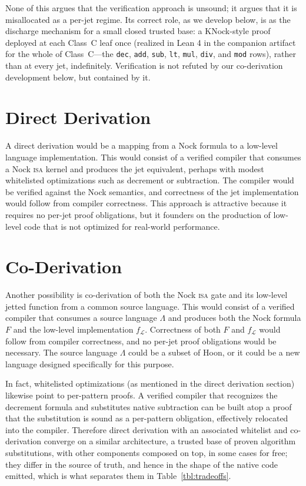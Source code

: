 \documentclass[twoside]{article}
\begin{document}
None of this argues that the verification approach is unsound; it argues that it is misallocated as a per-jet regime.  Its correct role, as we develop below, is as the discharge mechanism for a small closed trusted base: a KNock-style proof deployed at each Class~C leaf once (realized in Lean 4 in the companion artifact for the whole of Class~C---the \lstinline[style=inlinecode]{dec}, \lstinline[style=inlinecode]{add}, \lstinline[style=inlinecode]{sub}, \lstinline[style=inlinecode]{lt}, \lstinline[style=inlinecode]{mul}, \lstinline[style=inlinecode]{div}, and \lstinline[style=inlinecode]{mod} rows), rather than at every jet, indefinitely.  Verification is not refuted by our co-derivation development below, but contained by it.

\section{Direct Derivation}

A direct derivation would be a mapping from a Nock formula to a low-level language implementation.  This would consist of a verified compiler that consumes a Nock \textsc{isa} kernel and produces the jet equivalent, perhaps with modest whitelisted optimizations such as decrement or subtraction.  The compiler would be verified against the Nock semantics, and correctness of the jet implementation would follow from compiler correctness.  This approach is attractive because it requires no per-jet proof obligations, but it founders on the production of low-level code that is not optimized for real-world performance.

\section{Co-Derivation}

Another possibility is co-derivation of both the Nock \textsc{isa} gate and its low-level jetted function from a common source language.  This would consist of a verified compiler that consumes a source language $\Lambda$ and produces both the Nock formula $F$ and the low-level implementation $f_\mathcal{L}$.  Correctness of both $F$ and $f_\mathcal{L}$ would follow from compiler correctness, and no per-jet proof obligations would be necessary.  The source language $\Lambda$ could be a subset of Hoon, or it could be a new language designed specifically for this purpose.

In fact, whitelisted optimizations (as mentioned in the direct derivation section) likewise point to per-pattern proofs.  A verified compiler that recognizes the decrement formula and substitutes native subtraction can be built atop a proof that the substitution is sound as a per-pattern obligation, effectively relocated into the compiler.  Therefore direct derivation with an associated whitelist and co-derivation converge on a similar architecture, a trusted base of proven algorithm substitutions, with other components composed on top, in some cases for free; they differ in the source of truth, and hence in the shape of the native code emitted, which is what separates them in Table~\ref{tbl:tradeoffs}.
\end{document}
